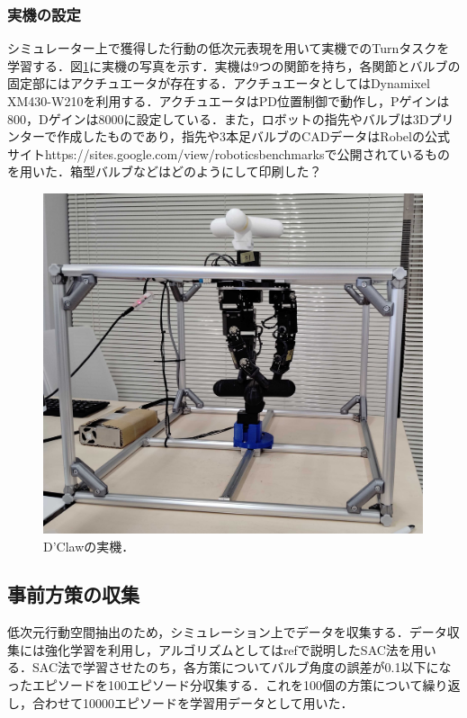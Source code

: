 \documentclass[dvipdfmx]{ampbt_nomag}
\begin{document}
\subsubsection{実機の設定}
シミュレーター上で獲得した行動の低次元表現を用いて実機でのTurnタスクを学習する．図\ref{dclaw_hardware}に実機の写真を示す．実機は9つの関節を持ち，各関節とバルブの固定部にはアクチュエータが存在する．アクチュエータとしてはDynamixel XM430-W210を利用する．アクチュエータはPD位置制御で動作し，Pゲインは800，Dゲインは8000に設定している．また，ロボットの指先やバルブは3Dプリンターで作成したものであり，指先や3本足バルブのCADデータはRobelの公式サイトhttps://sites.google.com/view/roboticsbenchmarksで公開されているものを用いた．箱型バルブなどはどのようにして印刷した？
\begin{figure}[hbtp]
  \centering
  \includegraphics[height=10cm]
       {asset/img/dclaw_hardware.pdf}
  \caption{D'Clawの実機．}
  \label{dclaw_hardware}
\end{figure}



\subsection{事前方策の収集}
低次元行動空間抽出のため，シミュレーション上でデータを収集する．データ収集には強化学習を利用し，アルゴリズムとしてはref{}で説明したSAC法を用いる．SAC法で学習させたのち，各方策についてバルブ角度の誤差が0.1以下になったエピソードを100エピソード分収集する．これを100個の方策について繰り返し，合わせて10000エピソードを学習用データとして用いた．
\end{document}
